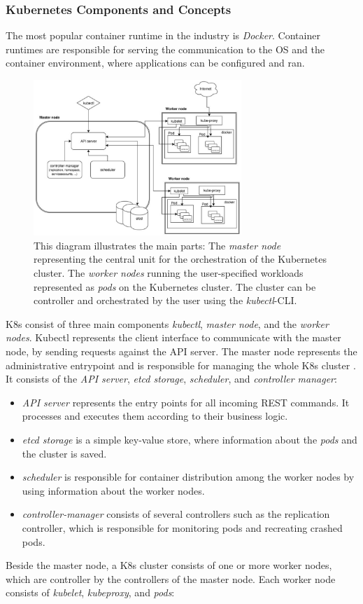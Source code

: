 \subsubsection*{Kubernetes Components and Concepts}
The most popular container runtime in the industry is \textit{Docker}. Container runtimes are responsible for serving the communication to the OS and the container environment, where applications can be configured and ran.
\begin{figure}
	\centering
	\includegraphics[width=0.7\textwidth]{resources/k8s_architecture}
	\caption[Architecture Diagram of K8s]{This diagram illustrates the main parts: The \textit{master node} representing the central unit for the orchestration of the Kubernetes cluster. The \textit{worker nodes} running the user-specified workloads represented as \textit{pods} on the Kubernetes cluster. The cluster can be controller and orchestrated by the user using the \textit{kubectl}-CLI. \cite{K8sArch}}
	\label{k8s_architecture}
\end{figure}
K8s consist of three main components \textit{kubectl}, \textit{master node}, and the \textit{worker nodes}. Kubectl represents the client interface to communicate with the master node, by sending requests against the API server. The master node represents the administrative entrypoint and is responsible for managing the whole K8s cluster \cite{K8sArch}. It consists of the \textit{API server}, \textit{etcd storage}, \textit{scheduler}, and \textit{controller manager}:

\begin{itemize}
	\item \textit{API server} represents the entry points for all incoming REST commands. It processes and executes them according to their business logic.
	\item \textit{etcd storage} is a simple key-value store, where information about the \textit{pods} and the cluster is saved.
	\item \textit{scheduler} is responsible for container distribution among the worker nodes by using information about the worker nodes. 
	\item \textit{controller-manager} consists of several controllers such as the replication controller, which is responsible for monitoring pods and recreating crashed pods.
\end{itemize}
Beside the master node, a K8s cluster consists of one or more worker nodes, which are controller by the controllers of the master node. Each worker node consists of \textit{kubelet}, \textit{kubeproxy}, and \textit{pods}:

